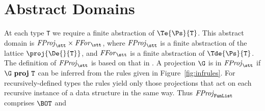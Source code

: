 \section{Abstract Domains}

At each type \mbox{\tt T} we require a finite abstraction of $\Te{\Ps}{\mbox{\tt T}}$.
This abstract domain is ${\it{}FProj}_{\subtypespace\stt}\times{\it{}FFor}_{\subtypespace\stt}$,
where ${\it{}FProj}_{\subtypespace\stt}$ is a finite abstraction of the lattice
$\proj{\De{}{\mbox{\tt T}}}$, and ${\it{}FFor}_{\subtypespace\stt}$ is a finite abstraction
of $\Tde{\Ps}{\mbox{\tt T}}$.  The definition of ${\it{}FProj}_{\subtypespace\stt}$ is based
on that in \cite{Lau91a}.  A projection $\G$ is in
${\it{}FProj}_{\subtypespace\stt}$ if $\G~\mbox{\bf proj}~\mbox{\tt T}$ can be inferred from
the rules given in Figure~\ref{fig:infrules}.
%
For recursively-defined types the rules yield only those
projections that act on each recursive instance of a data structure in
the same way.  Thus ${\it{}FProj}_{\subtypespace{\makebox{\subtypesize\tt FunList}} }$ comprises $\BOT$ and
